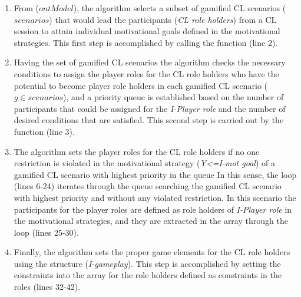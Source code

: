 \begin{enumerate}
\item From  ($ontModel$), the algorithm selects a subset of gamified CL scenarios ($scenarios$) that
would lead the participants (\emph{CL role holders}) from a CL session  to attain individual motivational goals defined in the motivational strategies. This first step is accomplished by calling the function  (line 2).

\item Having the set of gamified CL scenarios  the algorithm checks the necessary conditions to
assign the player roles for the CL role holders who have the potential to become player role holders in each gamified CL scenario ($g \in scenarios$), and a priority queue  is established based on the number of participants that could be assigned for the \emph{I-Player role} and the number of desired conditions that are satisfied. This second step is carried out by the function  (line 3).

\item The algorithm sets the player roles for the CL role holders if no one restriction is violated in the motivational strategy (\emph{Y<=I-mot goal}) of a gamified CL scenario  with highest priority in the queue  In this sense, the loop  (lines 6-24) iterates through the queue  searching the gamified CL scenario  with highest priority and without any violated restriction. In this scenario  the participants for the player roles are defined as role holders of \emph{I-Player role} in the motivational strategies, and they are extracted in the array  through the loop  (lines 25-30). 

\item Finally, the algorithm sets the proper game elements for the CL role holders using the structure  (\emph{I-gameplay}). This step is accomplished by setting the constraints  into the array  for the role holders  defined as constraints in the roles  (lines 32-42).
\end{enumerate}

